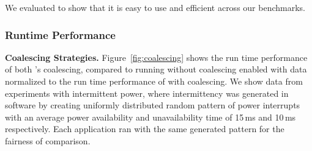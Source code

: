 We evaluated \sys to show that it is easy to use and efficient across our
benchmarks. %

%


\subsubsection{\sys Runtime Performance}
\label{sec:result_coalescing}

\textbf{Coalescing Strategies.} Figure~\ref{fig:coalescing} shows the run time performance of both \sys's coalescing, compared to \sys running without coalescing enabled with data normalized to the run time performance of \sys with coalescing. We show data from experiments with intermittent power, where intermittency was generated in software  by creating uniformly distributed random pattern of power interrupts with an average power availability and unavailability time of 15\,ms and 10\,ms respectively. Each application ran with the same generated pattern for the fairness of comparison. 

